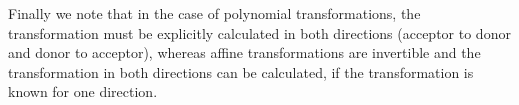 \documentclass[11pt]{article}
\begin{document}
Finally we note that in the case of polynomial transformations, the transformation must be explicitly calculated in both directions (acceptor to donor and donor to acceptor), whereas affine transformations are invertible and the transformation in both directions can be calculated, if the transformation is known for one direction.

%
%
%
\end{document}
